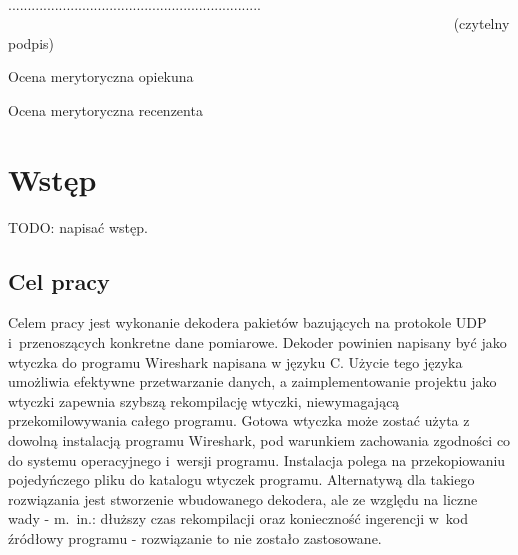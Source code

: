 \documentclass[a4paper, 12pt, twoside, openright]{article}
\begin{document}
\begin{center}

~~~~~~~~~~~~~~~~~~~~~~~~~~~~~~~~~~~~~~~~~~~~~~~~~~~~~~~~~~~~~~~~~ 
................................................................. \\
~~~~~~~~~~~~~~~~~~~~~~~~~~~~~~~~~~~~~~~~~~~~~~~~~~~~~~~~~~~~~~~  {\sf (czytelny podpis)} \\

\end{center}



\newpage
\linespread{1.3}
\selectfont

\hspace*{\fill}\large{Ocena merytoryczna opiekuna}

\vspace{85mm}

\newpage
\linespread{1.3}
\selectfont

\hspace*{\fill}\large{Ocena merytoryczna recenzenta}

\vspace{85mm}


\newpage
\tableofcontents


\newpage
\section{Wstęp}

TODO: napisać wstęp.


	\newpage
	\subsection{Cel pracy}

	\indent\par
	Celem pracy jest wykonanie dekodera pakietów bazujących na protokole UDP i~przenoszących konkretne dane pomiarowe.
	Dekoder powinien napisany być jako wtyczka do programu Wireshark napisana w języku C. Użycie tego języka umożliwia efektywne
	przetwarzanie danych, a zaimplementowanie projektu jako wtyczki zapewnia szybszą rekompilację wtyczki,
	niewymagającą przekomilowywania całego programu. Gotowa wtyczka może zostać użyta z dowolną instalacją programu Wireshark,
	pod warunkiem zachowania zgodności co do systemu operacyjnego i~wersji programu. Instalacja polega na przekopiowaniu
	pojedyńczego pliku do katalogu wtyczek programu. Alternatywą dla takiego rozwiązania jest stworzenie wbudowanego dekodera,
	ale ze względu na liczne wady - m.~in.: dłuższy czas rekompilacji oraz konieczność ingerencji w~kod źródłowy programu - rozwiązanie
	to nie zostało zastosowane.
\end{document}
